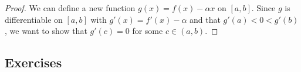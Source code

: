 \begin{proof}
    We can define a new function \( g(x) = f(x) - \alpha x  \) on \( [a,b]  \). Since \( g  \) is differentiable on \( [a,b]  \) with \( g'(x)  = f'(x) - \alpha  \) and that \( g'(a) < 0 < g'(b)  \), we want to show that \( g'(c) = 0  \) for some \( c \in (a,b)  \).
\end{proof}

\subsection{Exercises}










